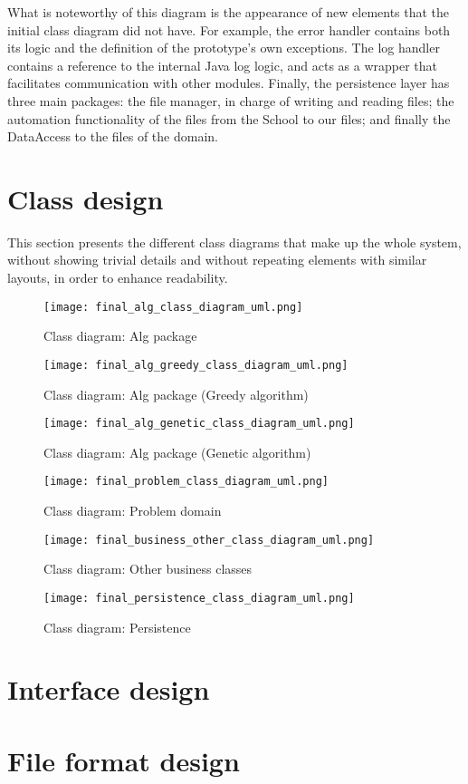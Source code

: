 What is noteworthy of this diagram is the appearance of new elements that the initial class diagram did not have. For example, the error handler contains both its logic and the definition of the prototype's own exceptions. The log handler contains a reference to the internal Java log logic, and acts as a wrapper that facilitates communication with other modules. Finally, the persistence layer has three main packages: the file manager, in charge of writing and reading files; the automation functionality of the files from the School to our files; and finally the DataAccess to the files of the domain.




\section{Class design}

This section presents the different class diagrams that make up the whole system, without showing trivial details and without repeating elements with similar layouts, in order to enhance readability.


\begin{figure}[H]
    \caption{Class diagram: Alg package}
  \centering
  \texttt{[image: final\_alg\_class\_diagram\_uml.png]}
\end{figure}

\begin{figure}[H]
    \caption{Class diagram: Alg package (Greedy algorithm)}
  \centering
  \texttt{[image: final\_alg\_greedy\_class\_diagram\_uml.png]}
\end{figure}

\begin{figure}[H]
    \caption{Class diagram: Alg package (Genetic algorithm)}
  \centering
  \texttt{[image: final\_alg\_genetic\_class\_diagram\_uml.png]}
\end{figure}

\begin{figure}[H]
    \caption{Class diagram: Problem domain}
  \centering
  \texttt{[image: final\_problem\_class\_diagram\_uml.png]}
\end{figure}

\begin{figure}[H]
    \caption{Class diagram: Other business classes}
  \centering
  \texttt{[image: final\_business\_other\_class\_diagram\_uml.png]}
\end{figure}

\begin{figure}[H]
    \caption{Class diagram: Persistence}
  \centering
  \texttt{[image: final\_persistence\_class\_diagram\_uml.png]}
\end{figure}



\section{Interface design}


\section{File format design}

